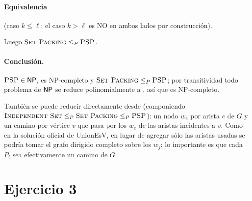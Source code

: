 \paragraph{Equivalencia} (caso $k\le\ell$; el caso $k>\ell$ es NO en ambos lados por construcción).
Luego $\textsc{Set Packing}\le_P\textsc{PSP}$.

\paragraph{Conclusión.} $\textsc{PSP}\in\mathsf{NP}$, \SP{} es NP-completo y $\textsc{Set Packing}\le_P\textsc{PSP}$; por transitividad todo problema de
$\mathsf{NP}$ se reduce polinomialmente a \PSP, así que \PSP{} es NP-completo.

\begin{observacion}
También se puede reducir directamente desde \IS{} (componiendo $\textsc{Independent Set}\le_P\textsc{Set Packing}\le_P\textsc{PSP}$): un nodo $w_e$ por
arista $e$ de $G$ y un camino por vértice $v$ que pasa por los $w_e$ de las aristas incidentes a $v$. Como en la
solución oficial de UnionEsV, en lugar de agregar sólo las aristas usadas se podría tomar el grafo dirigido
completo sobre los $w_j$; lo importante es que cada $P_i$ sea efectivamente un camino de $G$.
\end{observacion}

\section{Ejercicio 3}

